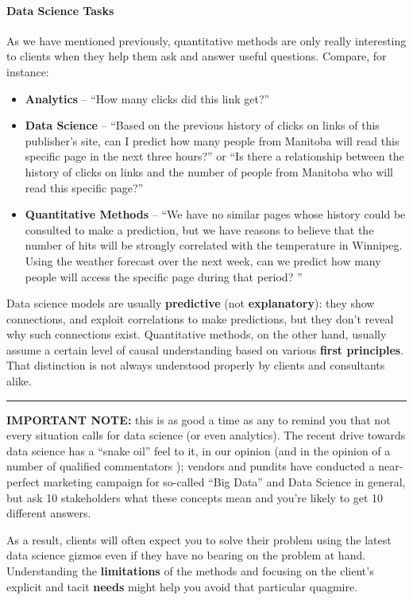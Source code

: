 \paragraph{Data Science Tasks}
As we have mentioned previously, quantitative methods are only really interesting to clients when they help them ask and answer useful questions. Compare, for instance:
\begin{itemize}[noitemsep] 
\item\textbf{Analytics} -- ``How many clicks did this link get?''
\item \textbf{Data Science} --  ``Based on the previous history of clicks on links of this publisher's site, can I predict how many people from Manitoba will read this specific page in the next three hours?'' or ``Is there a relationship between the history of clicks on links and the number of people from Manitoba who will read this specific page?''
\item \textbf{Quantitative Methods} -- ``We have no similar pages whose history could be consulted to make a prediction, but we have reasons to believe that the number of hits will be strongly correlated with the temperature in Winnipeg. Using the weather forecast over the next week, can we predict how many people will access the specific page during that period? ''
\end{itemize}
Data science models are usually \textbf{predictive} (not \textbf{explanatory}): they show connections, and exploit correlations to make predictions, but they don't reveal why such connections exist. Quantitative methods, on the other hand, usually assume a certain level of causal understanding based on various \textbf{first principles}. That distinction is not always understood properly by clients and consultants alike. 
\begin{center}
    \rule{0.5\textwidth}{.4pt}
\end{center}
\textbf{IMPORTANT NOTE:} this is as good a time as any to remind you that not every situation calls for data science (or even analytics). The recent drive towards data science has a ``snake oil'' feel to it, in our opinion (and in the opinion of a number of qualified commentators \cite{DSML_F}); vendors and pundits have conducted a near-perfect marketing campaign for so-called ``Big Data'' and Data Science in general, but ask 10 stakeholders what these concepts mean and you're likely to get 10 different answers. \par As a result, clients will often expect you to solve their problem using the latest data science gizmos even if they have no bearing on the problem at hand. Understanding the \textbf{limitations} of the methods and focusing on the client's explicit and tacit \textbf{needs} might help you avoid that particular quagmire.  
